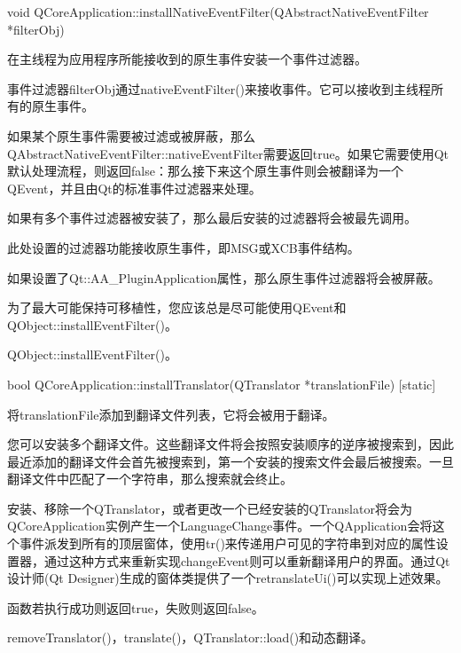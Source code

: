 void QCoreApplication::installNativeEventFilter(QAbstractNativeEventFilter *filterObj)

在主线程为应用程序所能接收到的原生事件安装一个事件过滤器。

事件过滤器filterObj通过nativeEventFilter()来接收事件。它可以接收到主线程所有的原生事件。

如果某个原生事件需要被过滤或被屏蔽，那么QAbstractNativeEventFilter::nativeEventFilter需要返回true。如果它需要使用Qt默认处理流程，则返回false：那么接下来这个原生事件则会被翻译为一个QEvent，并且由Qt的标准事件过滤器来处理。

如果有多个事件过滤器被安装了，那么最后安装的过滤器将会被最先调用。


\begin{notice}
 此处设置的过滤器功能接收原生事件，即MSG或XCB事件结构。
\end{notice}


\begin{notice}
如果设置了Qt::AA\_PluginApplication属性，那么原生事件过滤器将会被屏蔽。
\end{notice}


为了最大可能保持可移植性，您应该总是尽可能使用QEvent和QObject::installEventFilter()。



\begin{notice}[另请参阅]
QObject::installEventFilter()。
\end{notice}

bool QCoreApplication::installTranslator(QTranslator *translationFile) [static]

将translationFile添加到翻译文件列表，它将会被用于翻译。

您可以安装多个翻译文件。这些翻译文件将会按照安装顺序的逆序被搜索到，因此最近添加的翻译文件会首先被搜索到，第一个安装的搜索文件会最后被搜索。一旦翻译文件中匹配了一个字符串，那么搜索就会终止。

安装、移除一个QTranslator，或者更改一个已经安装的QTranslator将会为QCoreApplication实例产生一个LanguageChange事件。一个QApplication会将这个事件派发到所有的顶层窗体，使用tr()来传递用户可见的字符串到对应的属性设置器，通过这种方式来重新实现changeEvent则可以重新翻译用户的界面。通过Qt设计师(Qt Designer)生成的窗体类提供了一个retranslateUi()可以实现上述效果。

函数若执行成功则返回true，失败则返回false。



\begin{notice}[另请参阅]
removeTranslator()，translate()，QTranslator::load()和动态翻译。
\end{notice}

